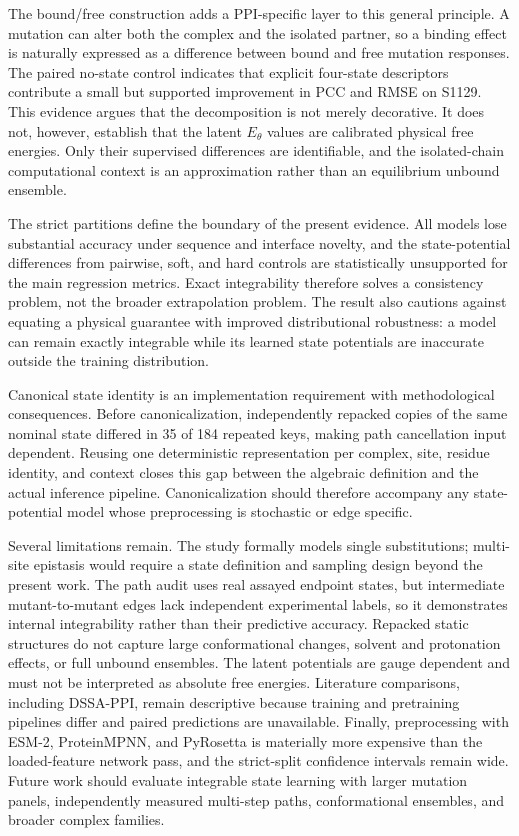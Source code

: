\documentclass[preprint,12pt]{elsarticle}
\begin{document}
The bound/free construction adds a PPI-specific layer to this general principle. A mutation can alter both the complex and the isolated partner, so a binding effect is naturally expressed as a difference between bound and free mutation responses. The paired no-state control indicates that explicit four-state descriptors contribute a small but supported improvement in PCC and RMSE on S1129. This evidence argues that the decomposition is not merely decorative. It does not, however, establish that the latent $E_\theta$ values are calibrated physical free energies. Only their supervised differences are identifiable, and the isolated-chain computational context is an approximation rather than an equilibrium unbound ensemble.

The strict partitions define the boundary of the present evidence. All models lose substantial accuracy under sequence and interface novelty, and the state-potential differences from pairwise, soft, and hard controls are statistically unsupported for the main regression metrics. Exact integrability therefore solves a consistency problem, not the broader extrapolation problem. The result also cautions against equating a physical guarantee with improved distributional robustness: a model can remain exactly integrable while its learned state potentials are inaccurate outside the training distribution.

Canonical state identity is an implementation requirement with methodological consequences. Before canonicalization, independently repacked copies of the same nominal state differed in 35 of 184 repeated keys, making path cancellation input dependent. Reusing one deterministic representation per complex, site, residue identity, and context closes this gap between the algebraic definition and the actual inference pipeline. Canonicalization should therefore accompany any state-potential model whose preprocessing is stochastic or edge specific.

Several limitations remain. The study formally models single substitutions; multi-site epistasis would require a state definition and sampling design beyond the present work. The path audit uses real assayed endpoint states, but intermediate mutant-to-mutant edges lack independent experimental labels, so it demonstrates internal integrability rather than their predictive accuracy. Repacked static structures do not capture large conformational changes, solvent and protonation effects, or full unbound ensembles. The latent potentials are gauge dependent and must not be interpreted as absolute free energies. Literature comparisons, including DSSA-PPI, remain descriptive because training and pretraining pipelines differ and paired predictions are unavailable. Finally, preprocessing with ESM-2, ProteinMPNN, and PyRosetta is materially more expensive than the loaded-feature network pass, and the strict-split confidence intervals remain wide. Future work should evaluate integrable state learning with larger mutation panels, independently measured multi-step paths, conformational ensembles, and broader complex families.
\end{document}
